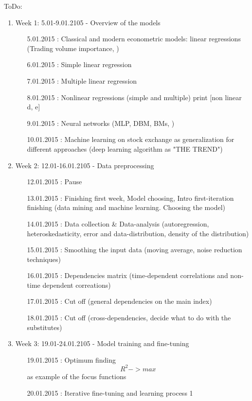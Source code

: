 \documentclass {article}
\begin{document}
ToDo:
\begin{enumerate}
	\item Week 1: 5.01-9.01.2105 - Overview of the models 
	\begin{enumerate}
		\item[5.01.2015]: Classical and modern econometric models:  linear regressions (Trading volume importance, ) 
		\item[6.01.2015]: Simple linear regression 	 		  
		\item[7.01.2015]: Multiple linear regression  
		\item[8.01.2015]: Nonlinear regressions (simple and multiple) print [non linear d, e]  
		\item[9.01.2015]: Neural networks (MLP, DBM, BMs, )
		\item[10.01.2015]: Machine learning on stock exchange as generalization for different approaches (deep learning algorithm as "THE TREND") 
	\end{enumerate}
	\item Week 2: 12.01-16.01.2105 - Data preprocessing
	\begin{enumerate}
		\item[12.01.2015]: Pause  
		\item[13.01.2015]: Finishing first week, Model choosing, Intro first-iteration finishing (data mining and machine learning. Choosing the model)  
		\item[14.01.2015]: Data collection  \& Data-analysis (autoregression, heteroskedasticity, error and data-distribution, density of the distribution)
		\item[15.01.2015]: Smoothing the input data (moving average, noise reduction techniques)
		\item[16.01.2015]: Dependencies matrix  (time-dependent correlations and non-time dependent correations)
		\item[17.01.2015]: Cut off (general dependencies on the main index)
		\item[18.01.2015]: Cut off (cross-dependencies, decide what to do with the substitutes)
	\end{enumerate}
	\item Week 3: 19.01-24.01.2105 - Model training and fine-tuning
	\begin{enumerate}
		\item[19.01.2015]: Optimum finding  \[ R^2 -> max \] as example of the focus functions
		\item[20.01.2015]: Iterative fine-tuning and learning process 1

\end{enumerate}
\end{enumerate}
\end{document}
